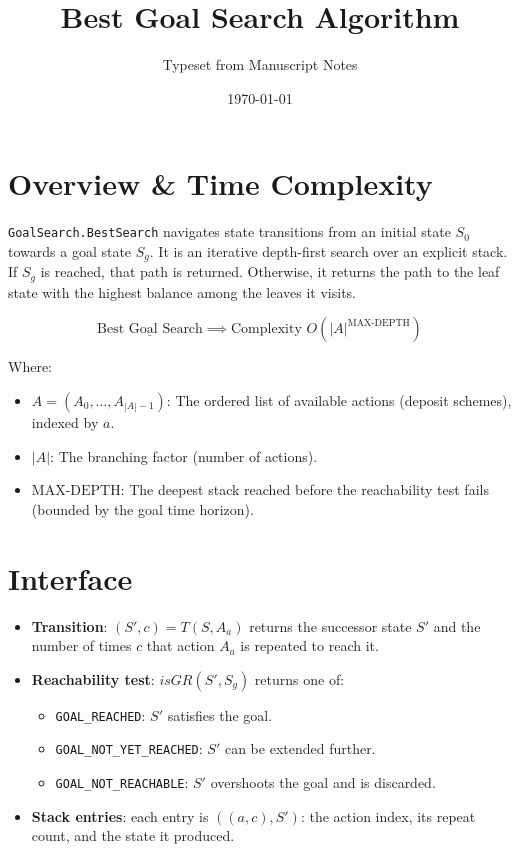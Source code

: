 \documentclass[11pt]{article}
\title{\vspace{-0.4in}\textbf{Best Goal Search Algorithm}\vspace{-0.25in}}
\author{Typeset from Manuscript Notes}
\date{\today}
\begin{document}
\maketitle

\section{Overview \& Time Complexity}
\texttt{GoalSearch.BestSearch} navigates state transitions from an initial
state $S_0$ towards a goal state $S_g$. It is an iterative depth-first search
over an explicit stack. If $S_g$ is reached, that path is returned. Otherwise,
it returns the path to the leaf state with the highest balance among the
leaves it visits.

\begin{equation*}
\underline{\text{Best Goal Search}} \implies \text{Complexity } O\!\left(|A|^{\text{MAX-DEPTH}}\right)
\end{equation*}

\noindent
Where:
\begin{itemize}\itemsep 0pt \parskip 0pt
    \item $A = (A_0, \dots, A_{|A|-1})$: The ordered list of available actions
          (deposit schemes), indexed by $a$.
    \item $|A|$: The branching factor (number of actions).
    \item $\text{MAX-DEPTH}$: The deepest stack reached before the
          reachability test fails (bounded by the goal time horizon).
\end{itemize}

\section{Interface}
\begin{itemize}\itemsep 0pt \parskip 0pt
    \item \textbf{Transition}: $(S', c) = T(S, A_a)$ returns the successor
          state $S'$ and the number of times $c$ that action $A_a$ is
          repeated to reach it.
    \item \textbf{Reachability test}: $\mathit{isGR}(S', S_g)$ returns one of:
          \begin{itemize}\itemsep 0pt \parskip 0pt
              \item \texttt{GOAL\_REACHED}: $S'$ satisfies the goal.
              \item \texttt{GOAL\_NOT\_YET\_REACHED}: $S'$ can be extended
                    further.
              \item \texttt{GOAL\_NOT\_REACHABLE}: $S'$ overshoots the goal
                    and is discarded.
          \end{itemize}
    \item \textbf{Stack entries}: each entry is $((a, c), S')$: the action
          index, its repeat count, and the state it produced.
\end{itemize}
\end{document}
